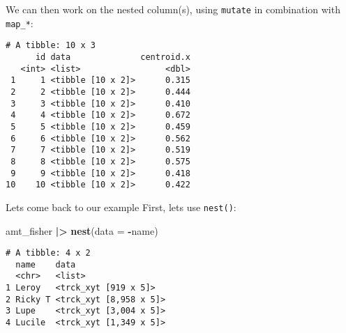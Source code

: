 \documentclass[ignorenonframetext,,t]{beamer}
\let\oldtextbf\textbf
\renewcommand{\textbf}[1]{\textcolor{spamwell}{\oldtextbf{#1}}}
\newenvironment{Shaded}{\begin{snugshade}}{\end{snugshade}}
\newcommand{\AttributeTok}[1]{\textcolor[rgb]{0.13,0.29,0.53}{#1}}
\newcommand{\FunctionTok}[1]{\textcolor[rgb]{0.13,0.29,0.53}{\textbf{#1}}}
\newcommand{\NormalTok}[1]{#1}
\newcommand{\SpecialCharTok}[1]{\textcolor[rgb]{0.81,0.36,0.00}{\textbf{#1}}}
\begin{document}
\begin{frame}[fragile]
We can then work on the nested column(s), using \texttt{mutate} in
combination with \texttt{map\_*}:

\begin{Shaded}
\end{Shaded}

\begin{verbatim}
# A tibble: 10 x 3
      id data              centroid.x
   <int> <list>                 <dbl>
 1     1 <tibble [10 x 2]>      0.315
 2     2 <tibble [10 x 2]>      0.444
 3     3 <tibble [10 x 2]>      0.410
 4     4 <tibble [10 x 2]>      0.672
 5     5 <tibble [10 x 2]>      0.459
 6     6 <tibble [10 x 2]>      0.562
 7     7 <tibble [10 x 2]>      0.519
 8     8 <tibble [10 x 2]>      0.575
 9     9 <tibble [10 x 2]>      0.418
10    10 <tibble [10 x 2]>      0.422
\end{verbatim}
\end{frame}

\begin{frame}[fragile]
\begin{block}{Lets come back to our example}
\protect\hypertarget{lets-come-back-to-our-example}{}
First, lets use \texttt{nest()}:

\begin{Shaded}
\begin{Highlighting}[]
\NormalTok{amt\_fisher }\SpecialCharTok{|\textgreater{}} \FunctionTok{nest}\NormalTok{(}\AttributeTok{data =} \SpecialCharTok{{-}}\NormalTok{name)}
\end{Highlighting}
\end{Shaded}

\begin{verbatim}
# A tibble: 4 x 2
  name    data                  
  <chr>   <list>                
1 Leroy   <trck_xyt [919 x 5]>  
2 Ricky T <trck_xyt [8,958 x 5]>
3 Lupe    <trck_xyt [3,004 x 5]>
4 Lucile  <trck_xyt [1,349 x 5]>
\end{verbatim}
\end{block}
\end{frame}
\end{document}
